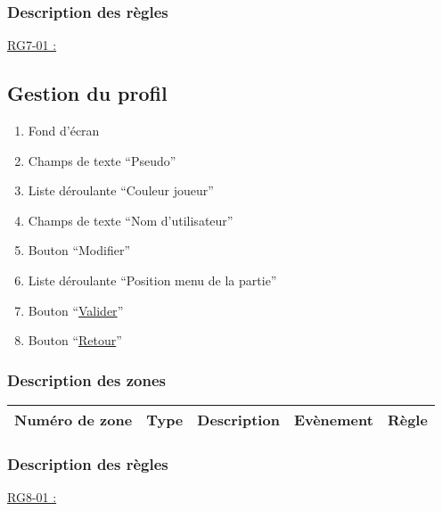 \documentclass{report}
\begin{document}
		\subsubsection{Description des règles}

			\underline{RG7-01 :}
				\begin{quote}
				
				\end{quote}
	
\newpage

	\subsection{Gestion du profil}
	
		\hypertarget{Gestion du profil}{}
		\label{Gestion du profil}
		
		
		
		\begin{enumerate}
		  \item Fond d'écran
		  \item Champs de texte ``Pseudo''
		  \item Liste déroulante ``Couleur joueur''
		  \item Champs de texte ``Nom d'utilisateur''
		  \item Bouton ``Modifier''
		  \item Liste déroulante ``Position menu de la partie''
		  \item Bouton ``\hyperlink{Options}{Valider}''
		  \item Bouton ``\hyperlink{Options}{Retour}''
		\end{enumerate}

		\subsubsection{Description des zones}
		
			\begin{tabular}{|c|c|c|c|c|} \hline
				Numéro de zone & Type  & Description & Evènement &	Règle \\\hline
			\end{tabular}
			
		\subsubsection{Description des règles}

			\underline{RG8-01 :}
				\begin{quote}
				
				\end{quote}
	
\end{document}
